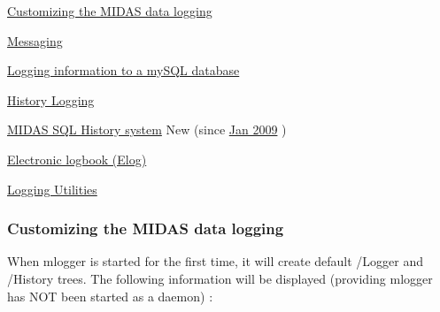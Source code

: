 \par


\par



\begin{DoxyItemize}
\item \hyperlink{F_Logging_Data}{Customizing the MIDAS data logging}
\item \hyperlink{F_Messaging}{Messaging}
\item \hyperlink{F_mySQL}{Logging information to a mySQL database}
\item \hyperlink{F_History_logging}{History Logging}
\begin{DoxyItemize}
\item \hyperlink{F_History_logging_F_History_sql_internal}{MIDAS SQL History system} New (since \hyperlink{NDF_ndf_jan_2009}{Jan 2009} )
\end{DoxyItemize}
\item \hyperlink{F_Elog}{Electronic logbook (Elog)}
\item \hyperlink{F_LogUtil}{Logging Utilities} \par
\par

\end{DoxyItemize}



\par
\par


\label{index_end}
\hypertarget{index_end}{}
 \subsubsection{Customizing the MIDAS data logging}\label{F_Logging_Data}
\label{F_Logging_Data_idx_Logging_Data}
\hypertarget{F_Logging_Data_idx_Logging_Data}{}
 

\par


When mlogger is started for the first time, it will create default /Logger and /History trees. The following information will be displayed (providing mlogger has NOT been started as a daemon) : 


